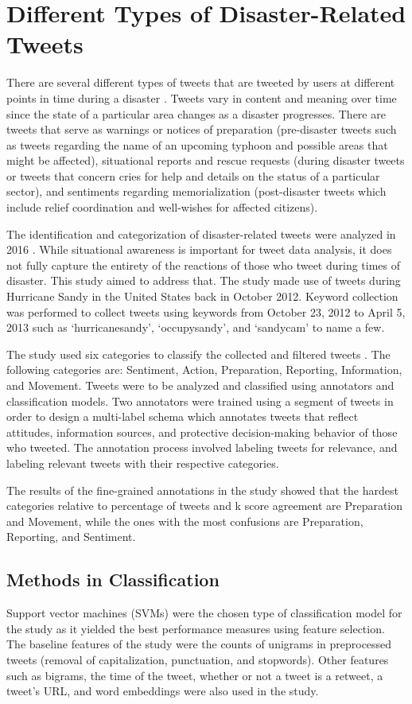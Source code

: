 \section{Different Types of Disaster-Related Tweets}
There are several different types of tweets that are tweeted by users at different points in time during a disaster \cite{cat2016,TTC2015}. Tweets vary in content and meaning over time since the state of a particular area changes as a disaster progresses. There are tweets that serve as warnings or notices of preparation (pre-disaster tweets such as tweets regarding the name of an upcoming typhoon and possible areas that might be affected), situational reports and rescue requests (during disaster tweets or tweets that concern cries for help and details on the status of a particular sector), and sentiments regarding memorialization (post-disaster tweets which include relief coordination and well-wishes for affected citizens). 

The identification and categorization of disaster-related tweets were analyzed in 2016 \cite{cat2016}. While situational awareness is important for tweet data analysis, it does not fully capture the entirety of the reactions of those who tweet during times of disaster. This study aimed to address that. The study made use of tweets during Hurricane Sandy in the United States back in October 2012. Keyword collection was performed to collect tweets using keywords from October 23, 2012 to April 5, 2013 such as ‘hurricanesandy’, ‘occupysandy’, and ‘sandycam’ to name a few. 

The study used six categories to classify the collected and filtered tweets \cite{cat2016}. The following categories are: Sentiment, Action, Preparation, Reporting, Information, and Movement. Tweets were to be analyzed and classified using annotators and classification models. Two annotators were trained using a segment of tweets in order to design a multi-label schema which annotates tweets that reflect attitudes, information sources, and protective decision-making behavior of those who tweeted. The annotation process involved labeling tweets for relevance, and labeling relevant tweets with their respective categories.

The results of the fine-grained annotations in the study showed that the hardest categories relative to percentage of tweets and k score agreement are Preparation and Movement, while the ones with the most confusions are Preparation, Reporting, and Sentiment. 

\subsection{Methods in Classification}
Support vector machines (SVMs) were the chosen type of classification model for the study as it yielded the best performance measures using feature selection. The baseline features of the study were the counts of unigrams in preprocessed tweets (removal of capitalization, punctuation, and stopwords). Other features such as bigrams, the time of the tweet, whether or not a tweet is a retweet, a tweet’s URL, and word embeddings were also used in the study. 

